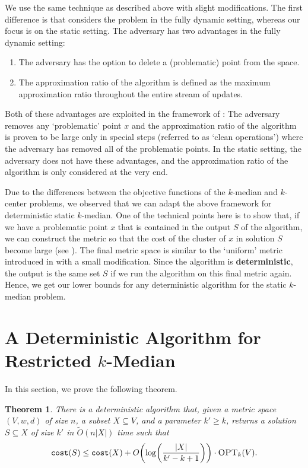 \documentclass[11pt]{article}
\newcommand{\1}{\mathmybb{1}}
\newtheorem{theorem}{Theorem}[section]
\newcommand{\OPT}{\textsc{OPT}}
\newcommand{\cost}{\textnormal{\texttt{cost}}}
\begin{document}
We use the same technique as described above with slight modifications.
The first difference is that \cite{BateniEFHJMW23} considers the problem in the fully dynamic setting, whereas our focus is on the static setting.
The adversary has two advantages in the fully dynamic setting:
\begin{enumerate}
    \item The adversary has the option to delete a (problematic) point from the space.
    \vspace{-0.2cm}
    \item The approximation ratio of the algorithm is defined as the maximum approximation ratio throughout the entire stream of updates.
\end{enumerate}
Both of these advantages are exploited in the framework of \cite{BateniEFHJMW23}:
The adversary removes any `problematic' point $x$ and
the approximation ratio of the algorithm is proven to be large only in special steps (referred to as `clean operations') where the adversary has removed all of the problematic points.
In the static setting, the adversary does not have these advantages, and the approximation ratio of the algorithm is only considered at the very end.


Due to the differences between the objective functions of the $k$-median and $k$-center problems, we observed that we can adapt the above framework for deterministic static $k$-median.
One of the technical points here is to show that, if we have a problematic point $x$ that is contained in the output $S$ of the algorithm, we can construct the metric so that the cost of the cluster of $x$ in solution $S$ become large (see ). 
The final metric space is similar to the `uniform' metric introduced in \cite{BateniEFHJMW23} with a small modification.
Since the algorithm is \textbf{deterministic}, the output is the same set $S$ if we run the algorithm on this final metric again.
Hence, we get our lower bounds for any deterministic algorithm for the static $k$-median problem.

 
\section{A Deterministic Algorithm for Restricted $k$-Median}\label{sec:restr}

In this section, we prove the following theorem.

\begin{theorem}\label{thm:restr}
    There is a deterministic algorithm that, given a metric space $(V,w,d)$ of size $n$, a subset $X \subseteq V$, and a parameter $k' \geq k$, returns a solution $S \subseteq X$ of size $k'$ in $\tilde O(n |X|)$ time such that
    $$ \cost(S) \leq \cost(X) + O \!\left( \log \! \left(\frac{|X|}{k' - k + 1} \right)\right) \cdot \OPT_k(V). $$
\end{theorem}
\end{document}
